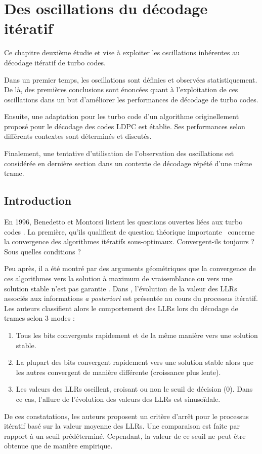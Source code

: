 \chapter{Des oscillations du décodage itératif} %
Ce chapitre deuxième étudie et vise à exploiter les oscillations inhérentes au décodage itératif de turbo codes. 

Dans un premier temps, les oscillations sont définies et observées statistiquement. De là, des premières conclusions sont
énoncées quant à l'exploitation de ces oscillations dans un but d'améliorer les performances de décodage de turbo codes.

Ensuite, une adaptation pour les turbo code d'un algorithme originellement proposé pour le décodage des codes LDPC est 
établie. Ses performances selon différents contextes sont déterminés et discutés.

Finalement, une tentative d'utilisation de l'observation des oscillations est considérée en dernière section dans un 
contexte de décodage répété d'une même trame.

\vspace*{\fill}
\minitocTITI
\vspace*{\fill}
\newpage

\section{Introduction}\label{sec:ch2_intro} 
En 1996, Benedetto et Montorsi listent les questions ouvertes liées aux turbo codes \cite{benedetto_unveiling}. La
première, qu'ils qualifient de \og question théorique importante \fg ~concerne la convergence des algorithmes itératifs 
sous-optimaux. \og Convergent-ils toujours ? Sous quelles conditions ? \fg

Peu après, il a été montré par des arguments géométriques que la convergence de ces algorithmes vers la solution à 
maximum de vraisemblance ou vers une solution stable n'est pas garantie \cite{richardson_geometry}.
Dans \cite{reid_convergence}, l'évolution de la valeur des LLRs associés aux informations \textit{a posteriori} est présentée au 
cours du processus itératif. Les auteurs classifient alors le comportement des LLRs lors du décodage de trames selon 3 modes : 
\begin{enumerate}
	\item Tous les bits convergents rapidement et de la même manière vers une solution stable.
	\item La plupart des bits convergent rapidement vers une solution stable alors que les autres convergent de manière 
	différente (croissance plus lente).
	\item Les valeurs des LLRs oscillent, croisant ou non le seuil de décision (0). Dans ce cas, l'allure de l'évolution
	des valeurs des LLRs est sinusoïdale.
\end{enumerate}
De ces constatations, les auteurs proposent un critère d'arrêt pour le processus itératif basé sur la valeur moyenne des 
LLRs. Une comparaison est faite par rapport à un seuil prédéterminé. Cependant, la valeur de ce seuil ne peut être 
obtenue que de manière empirique. %

